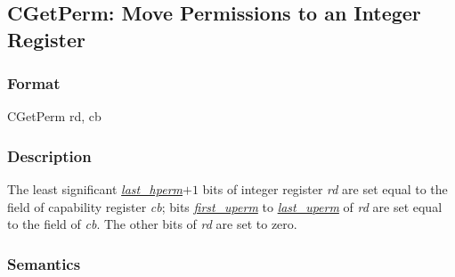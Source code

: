 \clearpage
{}
{}
\subsection*{CGetPerm: Move Permissions to an Integer Register}

\subsubsection*{Format}

CGetPerm rd, cb

\begin{center}
\end{center}

\subsubsection*{Description}

The least significant \hyperref[table:pseudocode-constants]{\emph{last\_hperm}}$+1$ bits of integer register \emph{rd} are set
equal to the \cperms{} field of capability register \emph{cb}; bits
\hyperref[table:pseudocode-constants]{\emph{first\_uperm}} to
\hyperref[table:pseudocode-constants]{\emph{last\_uperm}} of \emph{rd} are set equal to the
\cuperms{} field of \emph{cb}.  The other bits of \emph{rd} are set to zero.

\subsubsection*{Semantics}


